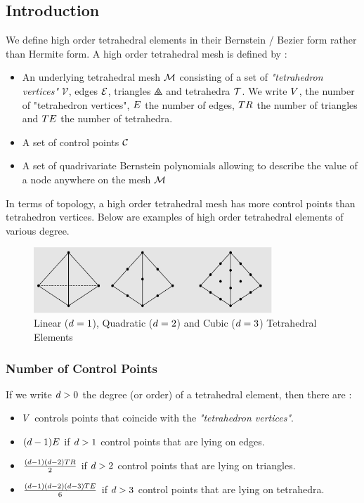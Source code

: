 \documentclass[a4paper,11pt]{article}
\renewcommand{\vertices}{{\mathcal V}}
\begin{document}
\subsection{Introduction}

We define high order tetrahedral elements in their Bernstein / Bezier form rather than Hermite form. 
A high order tetrahedral mesh is defined by :

\begin{itemize}
	\item An underlying tetrahedral mesh ${\mathcal M}$ consisting of a set of {\em "tetrahedron vertices"} $\vertices$, edges ${\mathcal E}$, triangles $\triangles$ and tetrahedra ${\mathcal T}$. We write ${ V}$, the number of "tetrahedron vertices", ${ E}$ the number of edges, ${ TR}$ the number of triangles and ${ TE}$ the number of tetrahedra. 
	\item A set of control points ${\mathcal C}$
	\item A set of quadrivariate Bernstein polynomials  allowing to describe the value of a node anywhere on the mesh ${\mathcal M}$ 
\end{itemize}
%

In terms of topology, a high order tetrahedral mesh has more control points than tetrahedron vertices.
Below are examples of high order tetrahedral elements of various degree.
\begin{figure}[!htbp]
	\centering
    \includegraphics[width=0.80\textwidth]{HighOrderTetra}
	\caption{Linear (${d}=1$), Quadratic (${d}=2$) and Cubic (${d}=3$) Tetrahedral Elements}
	\label{fig:LinearQuadraticAndCubicTetrahedralElements}
\end{figure}


\subsubsection{Number of Control Points}

If we write ${d}>0$ the degree (or order) of a tetrahedral element, then there are :

\begin{itemize}
	\item ${ V}$ controls points that coincide with the {\em "tetrahedron vertices"}.
	\item $({d}-1) { E}$ if ${d}>1$ control points that are lying on edges. 
	\item $\frac{({d}-1) ({d}-2) { TR}}{2}$ if ${d}>2$ control points that are lying on triangles. 
	\item $\frac{({d}-1) ({d}-2) ({d}-3) { TE}}{6}$ if ${d}>3$ control points that are lying on tetrahedra. 
\end{itemize}
\end{document}
